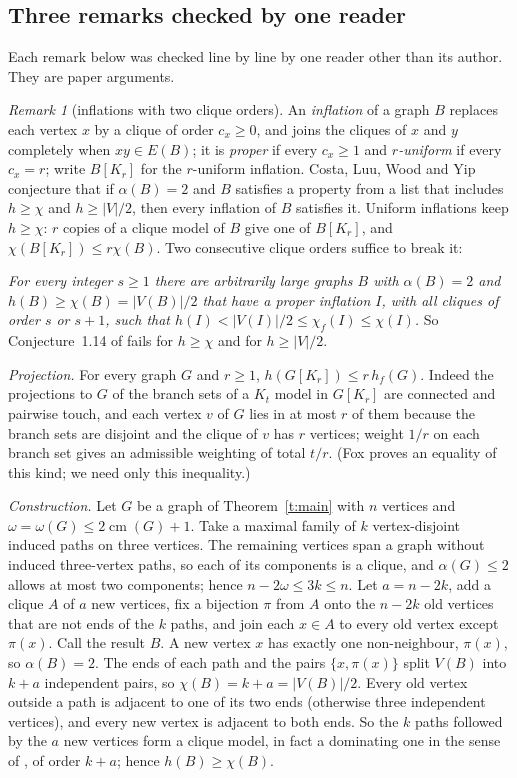 \documentclass[11pt]{article}
\theoremstyle{definition}\newtheorem{conjecture}[theorem]{Conjecture}
\theoremstyle{remark}\newtheorem{remark}[theorem]{Remark}
\newcommand{\cm}{\operatorname{cm}}
\begin{document}
\subsection{Three remarks checked by one reader}
Each remark below was checked line by line by one reader other than its author. They are paper arguments.

\begin{remark}[inflations with two clique orders]\label{r:infl}
An \emph{inflation} of a graph $B$ replaces each vertex $x$ by a clique of order $c_x\ge0$, and joins the cliques of $x$ and
$y$ completely when $xy\in E(B)$; it is \emph{proper} if every $c_x\ge1$ and \emph{$r$-uniform} if every $c_x=r$; write
$B[K_r]$ for the $r$-uniform inflation. Costa, Luu, Wood and Yip \cite[Conjecture~1.14]{CLWY} conjecture that if $\alpha(B)=2$
and $B$ satisfies a property from a list that includes $h\ge\chi$ and $h\ge|V|/2$, then every inflation of $B$ satisfies it.
Uniform inflations keep $h\ge\chi$: $r$ copies of a clique model of $B$ give one of $B[K_r]$, and
$\chi(B[K_r])\le r\chi(B)$. Two consecutive clique orders suffice to break it:

\emph{For every integer $s\ge1$ there are arbitrarily large graphs $B$ with $\alpha(B)=2$ and $h(B)\ge\chi(B)=|V(B)|/2$ that have a
proper inflation $I$, with all cliques of order $s$ or $s+1$, such that $h(I)<|V(I)|/2\le\chi_f(I)\le\chi(I)$.} So
Conjecture~1.14 of \cite{CLWY} fails for $h\ge\chi$ and for $h\ge|V|/2$.

\emph{Projection.} For every graph $G$ and $r\ge1$, $h(G[K_r])\le r\,h_f(G)$. Indeed the projections to $G$ of the branch sets
of a $K_t$ model in $G[K_r]$ are connected and pairwise touch, and each vertex $v$ of $G$ lies in at most $r$ of them because
the branch sets are disjoint and the clique of $v$ has $r$ vertices; weight $1/r$ on each branch set gives an admissible
weighting of total $t/r$. (Fox \cite{Fox11} proves an equality of this kind; we need only this inequality.)

\emph{Construction.} Let $G$ be a graph of Theorem~\ref{t:main} with $n$ vertices and $\omega=\omega(G)\le2\cm(G)+1$. Take a
maximal family of $k$ vertex-disjoint induced paths on three vertices. The remaining vertices span a graph without induced
three-vertex paths, so each of its components is a clique, and $\alpha(G)\le2$ allows at most two components; hence
$n-2\omega\le3k\le n$. Let $a=n-2k$, add a clique $A$ of $a$ new vertices, fix a bijection $\pi$ from $A$ onto the $n-2k$ old
vertices that are not ends of the $k$ paths, and join each $x\in A$ to every old vertex except $\pi(x)$. Call the result $B$.
A new vertex $x$ has exactly one non-neighbour, $\pi(x)$, so $\alpha(B)=2$. The ends of each path and the pairs
$\{x,\pi(x)\}$ split $V(B)$ into $k+a$ independent pairs, so $\chi(B)=k+a=|V(B)|/2$. Every old vertex outside a path is
adjacent to one of its two ends (otherwise three independent vertices), and every new vertex is adjacent to both ends. So the
$k$ paths followed by the $a$ new vertices form a clique model, in fact a dominating one in the sense of \cite{KWY}, of
order $k+a$; hence $h(B)\ge\chi(B)$.


\end{remark}
\end{document}
